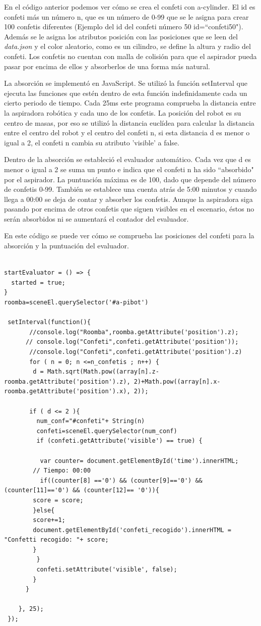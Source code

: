 En el código anterior podemos ver cómo se crea el confeti con a-cylinder. El id es confeti más un número  n, que es un número de 0-99 que se le asigna para crear 100 confetis diferentes (Ejemplo del id del confeti número 50   id=``confeti50"). Además se le asigna los atributos posición con las posiciones que se leen del \textit{data.json} y el color aleatorio, como es un cilindro, se define la altura y radio del confeti.
Los confetis no cuentan con malla de colisión para que el aspirador pueda pasar por encima de ellos y absorberlos de una forma más natural.

La absorción se implementó en JavaScript. Se utilizó la función setInterval que ejecuta las funciones que estén dentro de esta función indefinidamente cada un cierto periodo de tiempo.
Cada 25ms este programa comprueba la distancia entre la aspiradora robótica y cada uno de los confetis. La posición del robot es su centro de masas, por eso se  utilizó la distancia euclídea para calcular la distancia entre el centro del robot y el centro del confeti n, si esta distancia d es menor o igual a 2, el confeti n cambia su atributo 'visible' a false. 

Dentro de la absorción se estableció el evaluador automático. Cada vez que d es menor o igual a 2 se suma un punto e indica que el confeti n ha sido  ``absorbido" por el aspirador. La puntuación máxima es de 100, dado que depende del número de confetis 0-99. También se establece una cuenta atrás de 5:00 minutos y cuando llega a 00:00 se deja de contar y absorber los confetis. Aunque la aspiradora siga pasando por encima de otros confetis que siguen visibles en el escenario, éstos no serán absorbidos ni se aumentará el contador del evaluador.

En este código se puede ver cómo se comprueba las posiciones del confeti para la absorción y la puntuación del evaluador.
\begin{lstlisting}

startEvaluator = () => {
  started = true;
}
roomba=sceneEl.querySelector('#a-pibot')

 setInterval(function(){
       //console.log("Roomba",roomba.getAttribute('position').z);
      // console.log("Confeti",confeti.getAttribute('position'));
       //console.log("Confeti",confeti.getAttribute('position').z)
       for ( n = 0; n <=n_confetis ; n++) {
        d = Math.sqrt(Math.pow((array[n].z-roomba.getAttribute('position').z), 2)+Math.pow((array[n].x-roomba.getAttribute('position').x), 2));

       if ( d <= 2 ){
         num_conf="#confeti"+ String(n)
         confeti=sceneEl.querySelector(num_conf)
         if (confeti.getAttribute('visible') == true) {
	      
	      var counter= document.getElementById('time').innerHTML;
		// Tiempo: 00:00	
	      if((counter[8] =='0') && (counter[9]=='0') && (counter[11]=='0') && (counter[12]== '0')){      
		score = score;
		}else{
		score+=1;
		document.getElementById('confeti_recogido').innerHTML = "Confetti recogido: "+ score;
		}
         }
         confeti.setAttribute('visible', false);
        }
      }
	
    }, 25);
 });
\end{lstlisting}

